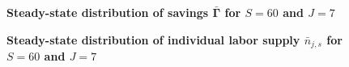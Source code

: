 \documentclass[letterpaper,12pt]{article}
\theoremstyle{definition}
\begin{document}
\begin{spacing}{1.5}
    \begin{figure}[htb]\centering \captionsetup{width=4.0in}
      \caption{\label{FigSavSS}\textbf{Steady-state distribution of savings $\bar{\bm{\Gamma}}$ for $S=60$ and $J=7$}}
    \end{figure}

    \begin{figure}[htb]\centering \captionsetup{width=4.0in}
      \caption{\label{FigLabSS}\textbf{Steady-state distribution of individual labor supply $\bar{n}_{j,s}$ for $S=60$ and $J=7$}}
    \end{figure}


\end{spacing}
\end{document}
